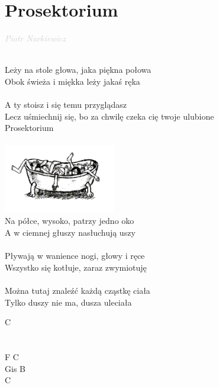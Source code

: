\documentclass[a5paper, 10pt]{book}
\begin{document}
\section{Prosektorium}\textcolor{lightgray}{\textit{Piotr Narkiewicz}}\\~\\
\begin{minipage}[t]{0.75\textwidth}
  Leży na stole głowa, jaka piękna połowa\\
  Obok świeża i miękka leży jakaś ręka\\
  \\
  \hspace*{5mm}A ty stoisz i się temu przyglądasz\\
  \hspace*{5mm}Lecz uśmiechnij się, bo za chwilę czeka cię twoje ulubione\\
  \hspace*{5mm}Prosektorium\\
  \\
  \hspace*{7cm}\includegraphics[height=3cm]{images/prosektorium.png}\vspace*{-3.05cm}\\
  Na półce, wysoko, patrzy jedno oko\\
  A w ciemnej głuszy nasłuchują uszy\\
  \\
  Pływają w wanience nogi, głowy i ręce\\
  Wszystko się kotłuje, zaraz zwymiotuję\\
  \\
  Można tutaj znaleźć każdą cząstkę ciała\\
  Tylko duszy nie ma, dusza uleciała\\
\end{minipage}
\begin{minipage}[t]{0.25\textwidth}
  C\\
  \\
  \\
  F C\\
  Gis B\\
  C\\
  \\
\end{minipage}
\end{document}
